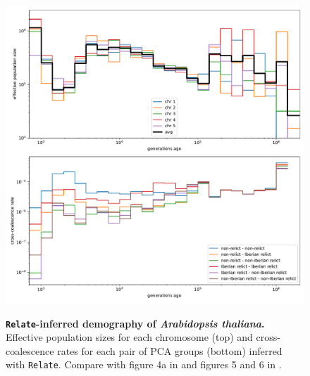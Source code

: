\documentclass[12pt]{article}
\begin{document}
\begin{figure}[!htb]

\includegraphics[width=\textwidth]{effective-population-sizes.pdf}

\caption{
\textbf{\texttt{Relate}-inferred demography of \textit{Arabidopsis thaliana}.}
Effective population sizes for each chromosome (top) and cross-coalescence rates for each pair of PCA groups (bottom) inferred with \texttt{Relate}. Compare with figure 4a in \cite{alonso2016} and figures 5 and 6 in \cite{durvasula2017african}.
}
\label{fig:nes}
\end{figure}
\end{document}
